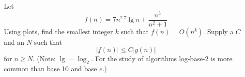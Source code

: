 Let
\[
f(n) = 7n^{2.7} \lg n + \frac{n^5}{n^2 + 1}
\]
Using plots, find the smallest integer $k$ such that $f(n) = O(n^k)$.
Supply a $C$ and an $N$ such that 
\[
|f(n)| \leq C |g(n)|
\]
for $n \geq N$.
(Note: $\lg = \log_2$. For the study of algorithms log-base-2 is more common than base 10 and base $e$.)
